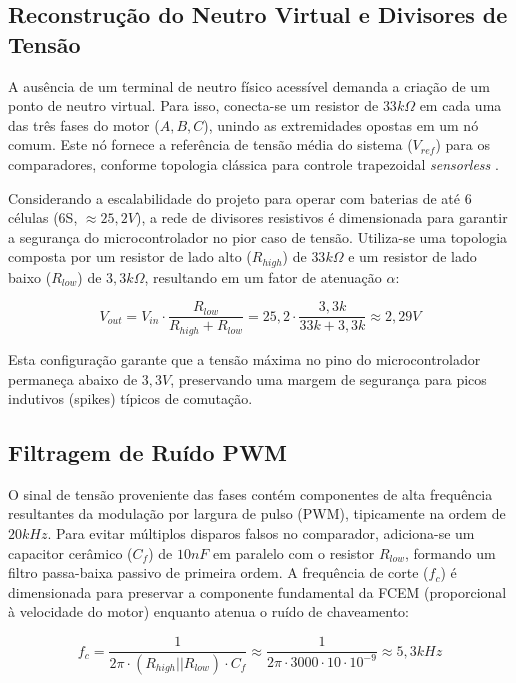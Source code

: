 \subsection{Reconstrução do Neutro Virtual e Divisores de Tensão}

A ausência de um terminal de neutro físico acessível demanda a criação de um ponto de neutro virtual. Para isso, conecta-se um resistor de $33k\Omega$ em cada uma das três fases do motor ($A, B, C$), unindo as extremidades opostas em um nó comum. Este nó fornece a referência de tensão média do sistema ($V_{ref}$) para os comparadores, conforme topologia clássica para controle trapezoidal \textit{sensorless} \cite{ti2013sensorless}.

Considerando a escalabilidade do projeto para operar com baterias de até 6 células (6S, $\approx 25,2V$), a rede de divisores resistivos é dimensionada para garantir a segurança do microcontrolador no pior caso de tensão. Utiliza-se uma topologia composta por um resistor de lado alto ($R_{high}$) de $33k\Omega$ e um resistor de lado baixo ($R_{low}$) de $3,3k\Omega$, resultando em um fator de atenuação $\alpha$:

\begin{equation}
    V_{out} = V_{in} \cdot \frac{R_{low}}{R_{high} + R_{low}} = 25,2 \cdot \frac{3,3k}{33k + 3,3k} \approx 2,29V
\end{equation}

Esta configuração garante que a tensão máxima no pino do microcontrolador permaneça abaixo de $3,3V$, preservando uma margem de segurança para picos indutivos (spikes) típicos de comutação.

\subsection{Filtragem de Ruído PWM}

O sinal de tensão proveniente das fases contém componentes de alta frequência resultantes da modulação por largura de pulso (PWM), tipicamente na ordem de $20kHz$. Para evitar múltiplos disparos falsos no comparador, adiciona-se um capacitor cerâmico ($C_f$) de $10nF$ em paralelo com o resistor $R_{low}$, formando um filtro passa-baixa passivo de primeira ordem. A frequência de corte ($f_c$) é dimensionada para preservar a componente fundamental da FCEM (proporcional à velocidade do motor) enquanto atenua o ruído de chaveamento:

\begin{equation}
    f_c = \frac{1}{2\pi \cdot (R_{high} || R_{low}) \cdot C_f} \approx \frac{1}{2\pi \cdot 3000 \cdot 10 \cdot 10^{-9}} \approx 5,3kHz
\end{equation}

